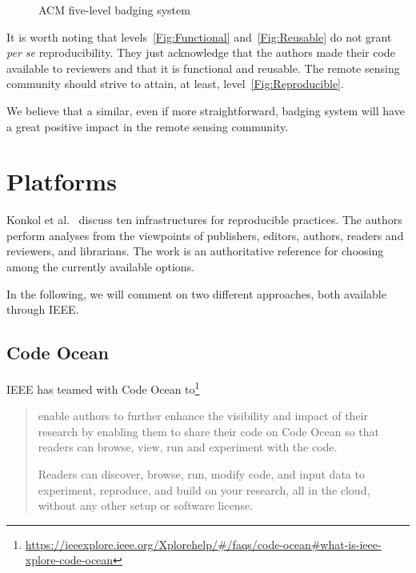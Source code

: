 \documentclass[journal,twoside]{IEEEtran}
\begin{document}
\begin{figure}[hbt]
	\centering
	\caption{ACM five-level badging system}\label{fig:ACM-Badging}
\end{figure}

It is worth noting that levels~\ref{Fig:Functional} and~\ref{Fig:Reusable} do not grant \textit{per se} reproducibility.
They just acknowledge that the authors made their code available to reviewers and that it is functional and reusable.
The remote sensing community should strive to attain, at least, level~\ref{Fig:Reproducible}.

We believe that a similar, even if more straightforward, badging system will have a great positive impact in the remote sensing community.

\section{Platforms}\label{Sec:IEEEPlatforms}

Konkol et al.~\cite{PublishingComputationalResearchaReviewofInfrastructuresforReproducibleandTransparentScholarlyCommunication} discuss ten infrastructures for reproducible practices.
The authors perform analyses from the viewpoints of publishers, editors, authors, readers and reviewers, and librarians.
The work is an authoritative reference for choosing among the currently available options.

In the following, we will comment on two different approaches, both available through IEEE.

\subsection{Code Ocean}

IEEE has teamed with Code Ocean to\footnote{\url{https://ieeexplore.ieee.org/Xplorehelp/#/faqs/code-ocean#what-is-ieee-xplore-code-ocean}}
\begin{quote}
	enable authors to further enhance the visibility and impact of their research by enabling them to share their code on Code Ocean so that readers can browse, view, run and experiment with the code.
	
	Readers can discover, browse, run, modify code, and input data to experiment, reproduce, and build on your research, all in the cloud, without any other setup or software license.
\end{quote}
\end{document}
